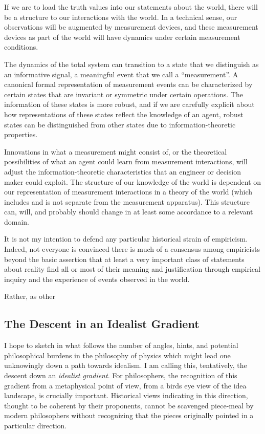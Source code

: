 If we are to load the truth values into our statements about the world, there will be a structure to our interactions with the world. In a technical sense, our observations will be augmented by measurement devices, and these measurement devices as part of the world will have dynamics under certain measurement conditions.  

The dynamics of the total system can transition to a state that we distinguish as an informative signal, a meaningful event that we call a ``measurement''.  A canonical formal representation of measurement events can be characterized by certain states that are invariant or symmetric under certain operations.  The information of these states is more robust, and if we are carefully explicit about how representations of these states reflect the knowledge of an agent, robust states can be distinguished from other states due to information-theoretic properties.

Innovations in what a measurement might consist of, or the theoretical possibilities of what an agent could learn from measurement interactions, will adjust the information-theoretic characteristics that an engineer or decision maker could exploit.  The structure of our knowledge of the world is dependent on our representation of measurement interactions in a theory of the world (which includes and is not separate from the measurement apparatus).  This structure can, will, and probably should change in at least some accordance to a relevant domain.

It is not my intention to defend any particular historical strain of empiricism.  Indeed, not everyone is convinced there is much of a consensus among empiricists beyond the basic assertion that at least a very important class of statements about reality find all or most of their meaning and justification through empirical inquiry and the experience of events observed in the world.  

Rather, as other

\subsection{The Descent in an Idealist Gradient}

I hope to sketch in what follows the number of angles, hints, and potential philosophical burdens in the philosophy of physics which might lead one unknowingly down a path towards idealism.  I am calling this, tentatively, the descent down an \emph{idealist gradient}.  For philosophers, the recognition of this gradient from a metaphysical point of view, from a birds eye view of the idea landscape, is crucially important.  Historical views indicating in this direction, thought to be coherent by their proponents, cannot be scavenged piece-meal by modern philosophers without recognizing that the pieces originally pointed in a particular direction.

